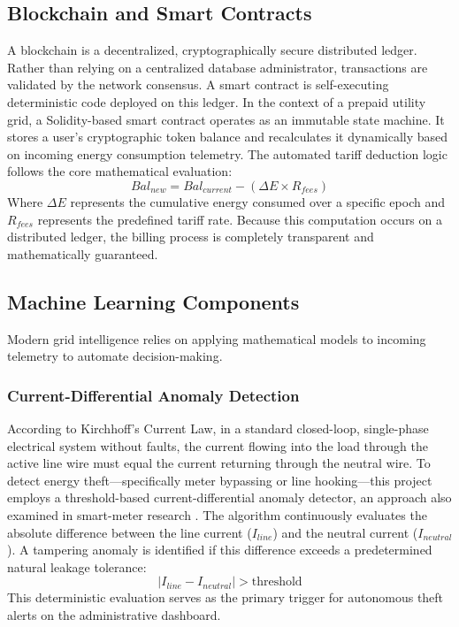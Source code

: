 \subsection{Blockchain and Smart Contracts}
A blockchain is a decentralized, cryptographically secure distributed ledger. Rather than relying on a centralized database administrator, transactions are validated by the network consensus. A smart contract is self-executing deterministic code deployed on this ledger. In the context of a prepaid utility grid, a Solidity-based smart contract operates as an immutable state machine. It stores a user's cryptographic token balance and recalculates it dynamically based on incoming energy consumption telemetry. The automated tariff deduction logic follows the core mathematical evaluation:
\[
Bal_{new} = Bal_{current} - (\Delta E \times R_{fees})
\]
Where $\Delta E$ represents the cumulative energy consumed over a specific epoch and $R_{fees}$ represents the predefined tariff rate. Because this computation occurs on a distributed ledger, the billing process is completely transparent and mathematically guaranteed.

\subsection{Machine Learning Components}
Modern grid intelligence relies on applying mathematical models to incoming telemetry to automate decision-making.

\subsubsection{Current-Differential Anomaly Detection}
According to Kirchhoff's Current Law, in a standard closed-loop, single-phase electrical system without faults, the current flowing into the load through the active line wire must equal the current returning through the neutral wire. To detect energy theft—specifically meter bypassing or line hooking—this project employs a threshold-based current-differential anomaly detector, an approach also examined in smart-meter research \cite{ayanlade2021energytheft}. The algorithm continuously evaluates the absolute difference between the line current ($I_{line}$) and the neutral current ($I_{neutral}$). A tampering anomaly is identified if this difference exceeds a predetermined natural leakage tolerance:
\[
\left\lvert I_{line} - I_{neutral} \right\rvert > \text{threshold}
\]
This deterministic evaluation serves as the primary trigger for autonomous theft alerts on the administrative dashboard.

